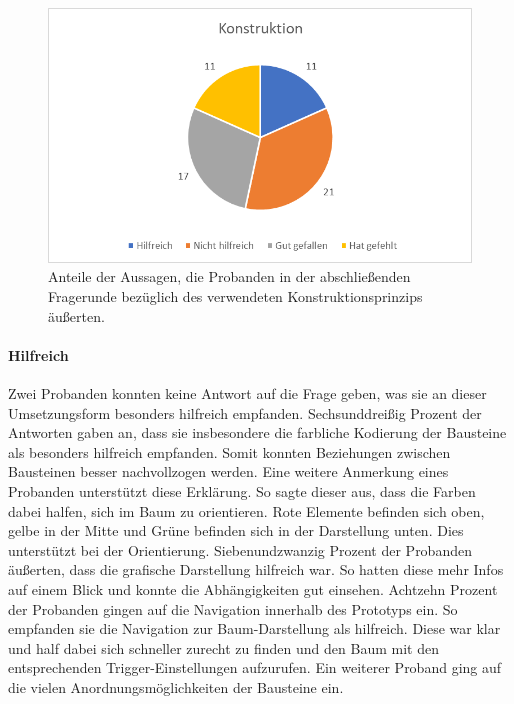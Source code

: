 \begin{figure}[h]
\centering
\includegraphics[width=1\textwidth]{pictures/diagramme/aussagenkonstr}
\caption{Anteile der Aussagen, die Probanden in der abschließenden Fragerunde bezüglich des verwendeten Konstruktionsprinzips äußerten.}
\label{aussagensichtb}
\end{figure}


\paragraph{Hilfreich}Zwei Probanden konnten keine Antwort auf die Frage geben, was sie an dieser Umsetzungsform besonders hilfreich empfanden. Sechsunddreißig Prozent der Antworten gaben an, dass sie insbesondere die farbliche Kodierung der Bausteine als besonders hilfreich empfanden. Somit konnten Beziehungen zwischen Bausteinen besser nachvollzogen werden. Eine weitere Anmerkung eines Probanden unterstützt diese Erklärung. So sagte dieser aus, dass die Farben dabei halfen, sich im Baum zu orientieren. Rote Elemente befinden sich oben, gelbe in der Mitte und Grüne befinden sich in der Darstellung unten. Dies unterstützt bei der Orientierung. Siebenundzwanzig Prozent der Probanden äußerten, dass die grafische Darstellung hilfreich war. So hatten diese mehr Infos auf einem Blick und konnte die Abhängigkeiten gut einsehen. Achtzehn Prozent der Probanden gingen auf die Navigation innerhalb des Prototyps ein. So empfanden sie die Navigation zur Baum-Darstellung als hilfreich. Diese war klar und half dabei sich schneller zurecht zu finden und den Baum mit den entsprechenden Trigger-Einstellungen aufzurufen. Ein weiterer Proband ging auf die vielen Anordnungsmöglichkeiten der Bausteine ein. 


